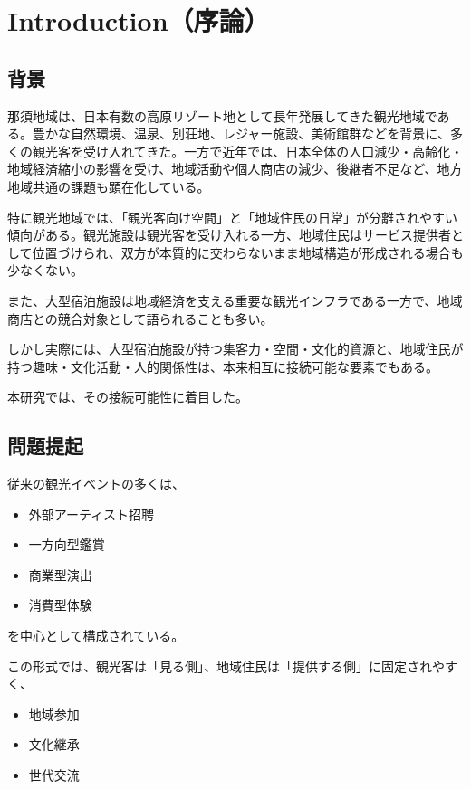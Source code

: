 \section{Introduction（序論）}

\subsection{背景}

那須地域は、日本有数の高原リゾート地として長年発展してきた観光地域である。豊かな自然環境、温泉、別荘地、レジャー施設、美術館群などを背景に、多くの観光客を受け入れてきた。一方で近年では、日本全体の人口減少・高齢化・地域経済縮小の影響を受け、地域活動や個人商店の減少、後継者不足など、地方地域共通の課題も顕在化している。

特に観光地域では、「観光客向け空間」と「地域住民の日常」が分離されやすい傾向がある。観光施設は観光客を受け入れる一方、地域住民はサービス提供者として位置づけられ、双方が本質的に交わらないまま地域構造が形成される場合も少なくない。

また、大型宿泊施設は地域経済を支える重要な観光インフラである一方で、地域商店との競合対象として語られることも多い。

しかし実際には、大型宿泊施設が持つ集客力・空間・文化的資源と、地域住民が持つ趣味・文化活動・人的関係性は、本来相互に接続可能な要素でもある。

本研究では、その接続可能性に着目した。


\subsection{問題提起}

従来の観光イベントの多くは、

\begin{itemize}
\item 外部アーティスト招聘
\item 一方向型鑑賞
\item 商業型演出
\item 消費型体験
\end{itemize}

を中心として構成されている。

この形式では、観光客は「見る側」、地域住民は「提供する側」に固定されやすく、

\begin{itemize}
\item 地域参加
\item 文化継承
\item 世代交流
\end{itemize}

